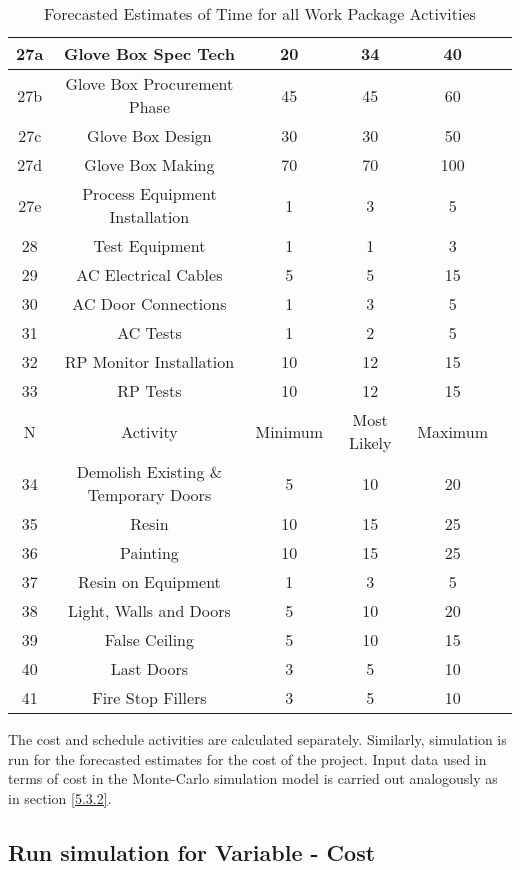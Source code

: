 \begin{table}[ht]
\begin{center}
\begin{tabular}{ |c|c|c|c|c| c|}
		\hline
		27a&Glove Box Spec Tech &20&34&40\\
		\hline
		27b&Glove Box Procurement Phase&45&45&60\\
		\hline
		27c&Glove Box Design&30&30&50\\
		\hline
		27d&Glove Box Making&70&70&100\\
		\hline
		27e&Process Equipment Installation&1&3&5\\
		\hline
		28&Test Equipment&1&1&3\\
		\hline
		29&AC Electrical Cables&5&5&15\\
		\hline
		30&AC Door Connections&1&3&5\\
		\hline
		31&AC Tests&1&2&5\\
		\hline
		32&RP Monitor Installation&10&12&15\\
		\hline
		33&RP Tests&10&12&15\\
		\hline
		N&Activity & Minimum & Most Likely & Maximum\\
		\hline
		34&Demolish Existing \& Temporary Doors&5&10&20\\
		\hline
		35&Resin&10&15&25\\
		\hline
		36&Painting&10&15&25\\
		\hline
		37&Resin on Equipment&1&3&5\\
		\hline
		38&Light, Walls and Doors&5&10&20\\
		\hline
		39&False Ceiling&5&10&15\\
		\hline
		40&Last Doors&3&5&10\\
		\hline
		41&Fire Stop Fillers&3&5&10\\
		\hline
	\end{tabular}
\end{center}

	\caption[Forecasted Estimates of Time for all Work Package Activities]{Forecasted Estimates of Time for all Work Package Activities}
\label{tab:caption5}
\end{table}%


The cost and schedule activities are calculated separately. Similarly, simulation is run for the forecasted estimates for the cost of the project. Input data used in terms of cost in the Monte-Carlo simulation model is carried out analogously as in section \ref{5.3.2}.  


\subsection{Run simulation for Variable - Cost}

